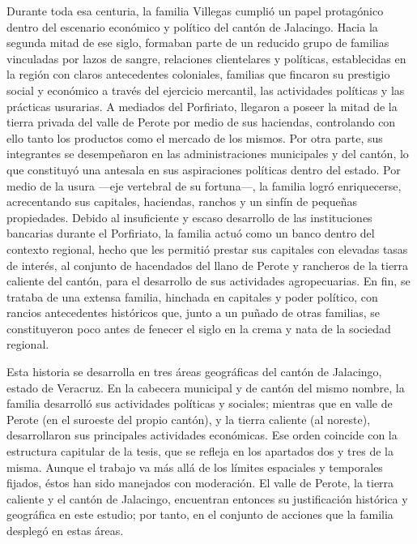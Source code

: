 \documentclass[14pt,twoside,final]{extbook} %
\begin{document}
Durante toda esa centuria, la familia Villegas cumplió un papel protagónico dentro del escenario económico y político del cantón de Jalacingo. Hacia la segunda mitad de ese siglo, formaban parte de un reducido grupo de familias vinculadas por lazos de sangre, relaciones clientelares y políticas, establecidas en la región con claros antecedentes coloniales, familias que fincaron su prestigio social y económico a través del ejercicio mercantil, las actividades políticas y las prácticas usurarias. A mediados del Porfiriato, llegaron a poseer la mitad de la tierra privada del valle de Perote por medio de sus haciendas, controlando con ello tanto los productos como el mercado de los mismos. Por otra parte, sus integrantes se desempeñaron en las administraciones municipales y del cantón, lo que constituyó una antesala en sus aspiraciones políticas dentro del estado. Por medio de la usura ---eje vertebral de su fortuna---, la familia logró enriquecerse, acrecentando sus capitales, haciendas, ranchos y un sinfín de pequeñas propiedades. Debido al insuficiente y escaso desarrollo de las instituciones bancarias durante el Porfiriato, la familia actuó como un banco dentro del contexto regional, hecho que les permitió prestar sus capitales con elevadas tasas de interés, al conjunto de hacendados del llano de Perote y rancheros de la tierra caliente del cantón, para el desarrollo de sus actividades agropecuarias. En fin, se trataba de una extensa familia, hinchada en capitales y poder político, con rancios antecedentes históricos que, junto a un puñado de otras familias, se constituyeron poco antes de fenecer el siglo en la crema y nata de la sociedad regional.

Esta historia se desarrolla en tres áreas geográficas del cantón de Jalacingo, estado de Veracruz. En la cabecera municipal y de cantón del mismo nombre, la familia desarrolló sus actividades políticas y sociales; mientras que en valle de Perote (en el suroeste del propio cantón), y la tierra caliente (al noreste), desarrollaron sus principales actividades económicas. Ese orden coincide con la estructura capitular de la tesis, que se refleja en los apartados dos y tres de la misma. Aunque el trabajo va más allá de los límites espaciales y temporales fijados, éstos han sido manejados con moderación. El valle de Perote, la tierra caliente y el cantón de Jalacingo, encuentran entonces su justificación histórica y geográfica en este estudio; por tanto, en el conjunto de acciones que la familia desplegó en estas áreas.
\end{document}
